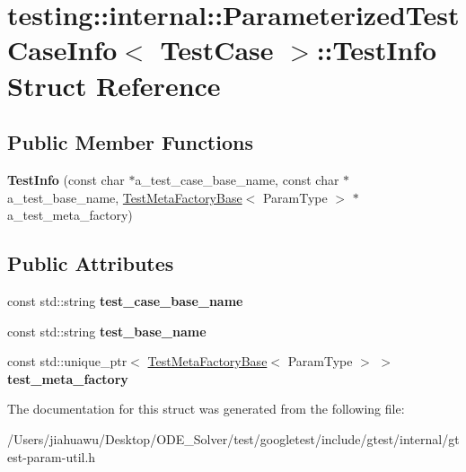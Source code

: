 \hypertarget{structtesting_1_1internal_1_1_parameterized_test_case_info_1_1_test_info}{}\section{testing\+:\+:internal\+:\+:Parameterized\+Test\+Case\+Info$<$ Test\+Case $>$\+:\+:Test\+Info Struct Reference}
\label{structtesting_1_1internal_1_1_parameterized_test_case_info_1_1_test_info}
\subsection*{Public Member Functions}
\begin{DoxyCompactItemize}
\item 
\mbox{\label{structtesting_1_1internal_1_1_parameterized_test_case_info_1_1_test_info_a97780f3a9b145f30d6803ea7b76abe19}} 
{\bfseries Test\+Info} (const char $\ast$a\+\_\+test\+\_\+case\+\_\+base\+\_\+name, const char $\ast$a\+\_\+test\+\_\+base\+\_\+name, \mbox{\hyperlink{classtesting_1_1internal_1_1_test_meta_factory_base}{Test\+Meta\+Factory\+Base}}$<$ Param\+Type $>$ $\ast$a\+\_\+test\+\_\+meta\+\_\+factory)
\end{DoxyCompactItemize}
\subsection*{Public Attributes}
\begin{DoxyCompactItemize}
\item 
\mbox{\label{structtesting_1_1internal_1_1_parameterized_test_case_info_1_1_test_info_a8e435bff3fb74db341a9d0507ceda206}} 
const std\+::string {\bfseries test\+\_\+case\+\_\+base\+\_\+name}
\item 
\mbox{\label{structtesting_1_1internal_1_1_parameterized_test_case_info_1_1_test_info_ab4be52255b150703b450d8ea7c8ab763}} 
const std\+::string {\bfseries test\+\_\+base\+\_\+name}
\item 
\mbox{\label{structtesting_1_1internal_1_1_parameterized_test_case_info_1_1_test_info_a66f82f1eb09971f2d01bd9c4773e9538}} 
const std\+::unique\+\_\+ptr$<$ \mbox{\hyperlink{classtesting_1_1internal_1_1_test_meta_factory_base}{Test\+Meta\+Factory\+Base}}$<$ Param\+Type $>$ $>$ {\bfseries test\+\_\+meta\+\_\+factory}
\end{DoxyCompactItemize}


The documentation for this struct was generated from the following file\+:\begin{DoxyCompactItemize}
\item 
/\+Users/jiahuawu/\+Desktop/\+O\+D\+E\+\_\+\+Solver/test/googletest/include/gtest/internal/gtest-\/param-\/util.\+h\end{DoxyCompactItemize}
